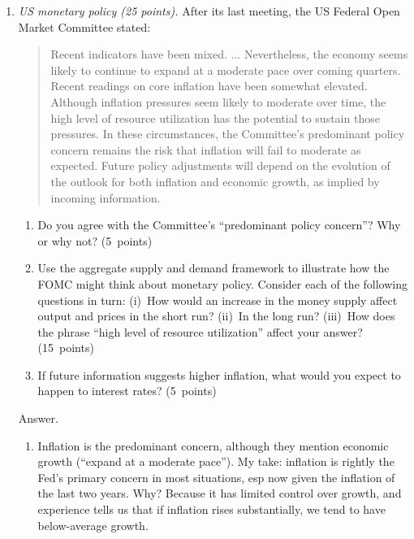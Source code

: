 \documentclass[letterpaper,12pt]{article}
\begin{document}
\begin{enumerate}
\item {\it US monetary policy (25 points).}
After its last meeting,
the US Federal Open Market Committee stated:
\begin{quote}
Recent indicators have been mixed. ...
Nevertheless, the economy seems likely to continue
to expand at a moderate pace over coming quarters.
%
Recent readings on core inflation have been somewhat elevated.
Although inflation pressures seem likely to moderate over time,
the high level of resource utilization has the potential
to sustain those pressures.
%
In these circumstances, the Committee's predominant policy concern remains the risk that inflation will fail to moderate as expected. Future policy adjustments will depend on the evolution of the outlook for both inflation and economic growth, as implied by incoming information.
\end{quote}
%
\begin{enumerate}
\item Do you agree with  the Committee's ``predominant policy concern''?
Why or why not?
(5~points)
\item Use the aggregate supply and demand framework
to illustrate how the FOMC might think about monetary policy.
Consider each of the following questions in turn:
(i)~How would an increase in the money supply affect
output and prices in the short run?
(ii)~In the long run?
(iii)~How does the phrase ``high level of resource utilization''
affect your answer?
(15~points)
\item If future information suggests higher inflation,
what would you expect to happen to interest rates?
(5~points)
\end{enumerate}

Answer.
\begin{enumerate}
\item Inflation is the predominant concern,
although they  mention economic growth
(``expand at a moderate pace'').
My take:  inflation is rightly the Fed's primary concern in most
situations, esp now given the inflation of the last two years. Why?
Because it has limited control over growth, and experience tells us
that if inflation rises substantially, we tend to have below-average
growth.


\end{enumerate}
\end{enumerate}
\end{document}
